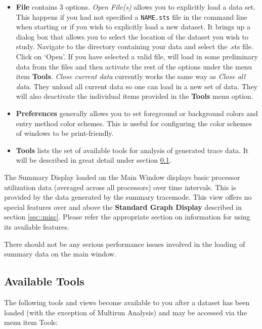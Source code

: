 \documentclass[10pt]{report}
\begin{document}
\begin{itemize}
\item
  {\bf File} contains 3 options. {\it Open File(s)} allows you to
  explicitly load a data set. This happens if you had not specified a
  {\tt NAME.sts} file in the command line when starting \projections{}
  or if you wish to explicitly load a new dataset. It brings up a
  dialog box that allows you to select the location of the dataset you
  wish to study. Navigate to the directory containing your data and
  select the .sts file.  Click on `Open'. If you have selected a valid
  file, \projections{} will load in some preliminary data from the
  files and then activate the rest of the options under the menu item
  {\bf Tools}. {\it Close current data} currently works the same way
  as {\it Close all data}. They unload all current \projections{} data
  so one can load in a new set of data. They will also deactivate the
  individual items provided in the {\bf Tools} menu option.
\item
  {\bf Preferences} generally allows you to set foreground or background
  colors and entry method color schemes. This is useful for configuring
  the color schemes of \projections{} windows to be print-friendly.
\item
  {\bf Tools} lists the set of available tools for analysis of generated
  trace data. It will be described in great detail under section
  \ref{sec::available tools}.
\end{itemize}


The Summary Display loaded on the Main Window displays basic processor
utilization data (averaged across all processors) over time
intervals. This is provided by the data generated by the summary
tracemode. This view offers no special features over and above the
{\bf Standard Graph Display} described in section \ref{sec::misc}. 
Please refer the appropriate section on information for using
its available features.


There should not be any serious performance issues involved in the
loading of summary data on the main window.

\subsection{Available Tools}
\label{sec::available tools}

The following tools and views become available to you after a dataset
has been loaded (with the exception of Multirun Analysis) and may be
accessed via the menu item Tools:
\end{document}
